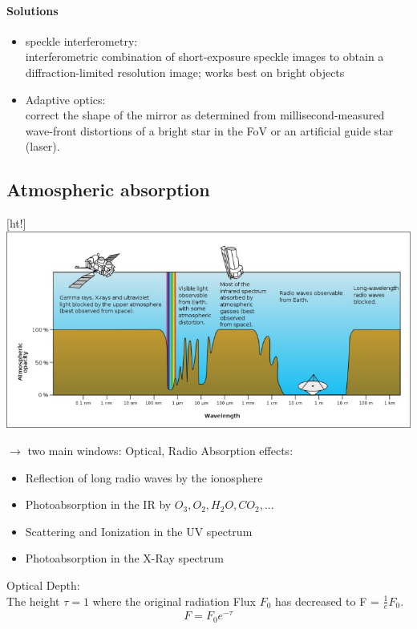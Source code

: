 \documentclass[11pt,a4paper]{article}
\begin{document}
\paragraph{Solutions}
\begin{itemize}
    \item speckle interferometry:  \\ 
        interferometric combination of short-exposure speckle images to obtain a diffraction-limited resolution image; works best on bright objects
    \item Adaptive optics: \\ 
        correct the shape of the mirror as determined from millisecond-measured
wave-front distortions of a bright star in the FoV or an artificial guide star (laser).
\end{itemize}
\subsection{Atmospheric absorption}
\begin{center}[ht!]
    \includegraphics[width=\linewidth]{screenshot_2024-01-12-190242.png}
\end{center}
$\rightarrow$ two main windows: Optical, Radio
Absorption effects:
\begin{itemize}
    \item Reflection of long radio waves by the ionosphere 
    \item Photoabsorption in the IR by $O_3, O_2, H_2 O, CO_2,...$
    \item Scattering and Ionization in the UV spectrum
    \item Photoabsorption in the X-Ray spectrum
\end{itemize}
Optical Depth: \\ 
The height $\tau = 1$ where the original radiation Flux $F_0$ has decreased to F = $\frac 1 e F_0$.
\begin{align*}
    F = F_0e^{-\tau} 
\end{align*}
\end{document}
